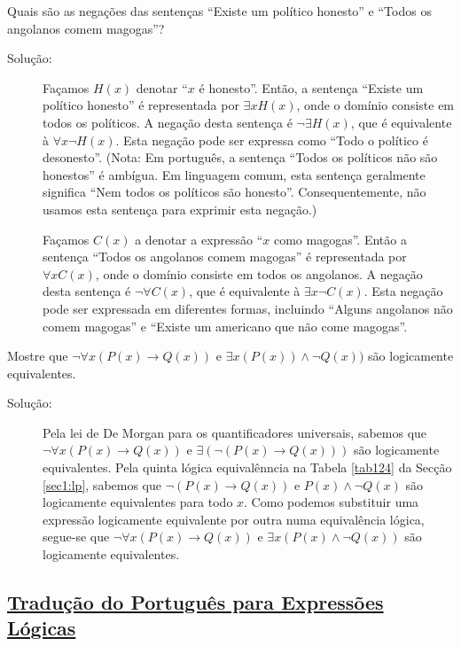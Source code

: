 \begin{exmp}
\label{exem144}
Quais são as negações das sentenças ``Existe um político honesto'' e ``Todos os
angolanos comem magogas''?
\begin{description}
\item[Solução:] Façamos $H(x)$ denotar ``$x$ é honesto''. Então, a sentença
``Existe um político honesto'' é representada por $\exists xH(x)$, onde o
domínio consiste em todos os políticos. A negação desta sentença é
$\lnot\exists H(x)$, que é equivalente à $\forall x\lnot H(x)$. Esta negação
pode ser expressa como ``Todo o político é desonesto''. (Nota: Em português, a
sentença ``Todos os políticos não são honestos'' é ambígua. Em linguagem comum,
esta sentença geralmente significa ``Nem todos os políticos são honesto''.
Consequentemente, não usamos esta sentença para exprimir esta negação.)


Façamos $C(x)$ a denotar a expressão ``$x$ como magogas''. Então a sentença
``Todos os angolanos comem magogas'' é representada por $\forall xC(x)$, onde o
domínio consiste em todos os angolanos. A negação desta sentença é $\lnot
\forall C(x)$, que é equivalente à $\exists x\lnot C(x)$. Esta negação pode ser
expressada em diferentes formas, incluindo ``Alguns angolanos não comem
magogas'' e ``Existe um americano que não come magogas''.
\end{description}
\end{exmp}

\begin{exmp}
\label{exem145}
Mostre que $\lnot \forall x(P(x) \to Q(x))$ e $\exists x(P(x)) \land \lnot
Q(x))$ são logicamente equivalentes.
\begin{description}
\item[Solução:]Pela lei de De Morgan para os quantificadores universais, sabemos
que $\lnot\forall x(P(x) \to Q(x))$ e $\exists (\lnot (P(x) \to Q(x)))$ são
logicamente equivalentes. Pela quinta lógica equivalênncia na Tabela
\ref{tab124} da Secção \ref{sec1:lp}, sabemos que $\lnot(P(x) \to Q(x))$ e
$P(x) \land \lnot Q(x)$ são logicamente equivalentes para todo $x$. Como podemos
substituir uma expressão logicamente equivalente por outra numa equivalência
lógica, segue-se que $\lnot \forall x(P(x) \to Q(x))$ e $\exists x(P(x) \land
\lnot Q(x))$ são logicamente equivalentes.
\end{description}

\end{exmp}

\subsection*{\underline{Tradução do Português para Expressões Lógicas}}

